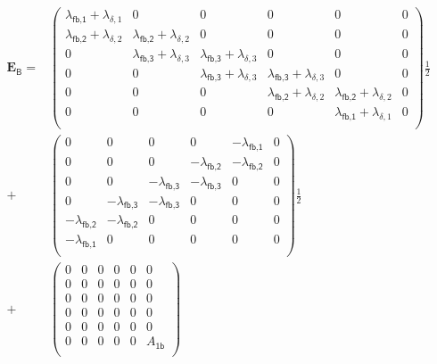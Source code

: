 %
\begin{equation}
\label{equ_04ModellLuft28}
\begin{aligned}
\textbf{E}_\textsf{B} = &\left(\begin{array}{cccccc} 
\lambda_\textsf{fb,1} + \lambda_{\delta,1} & 0 & 0 & 0 & 0 & 0 \\
\lambda_\textsf{fb,2} + \lambda_{\delta,2} & \lambda_\textsf{fb,2} + \lambda_{\delta,2} & 0 & 0 & 0 & 0 \\
0 & \lambda_\textsf{fb,3} + \lambda_{\delta,3} & \lambda_\textsf{fb,3} + \lambda_{\delta,3} & 0 & 0 & 0 \\
0 & 0 & \lambda_\textsf{fb,3} + \lambda_{\delta,3} & \lambda_\textsf{fb,3} + \lambda_{\delta,3} & 0 & 0 \\
0 & 0 & 0 & \lambda_\textsf{fb,2} + \lambda_{\delta,2} & \lambda_\textsf{fb,2} + \lambda_{\delta,2} & 0 \\
0 & 0 & 0 & 0 & \lambda_\textsf{fb,1} + \lambda_{\delta,1} & 0 \\
\end{array}\right) \frac{1}{2} \\
+ &\left(\begin{array}{cccccc} 
0 & 0 & 0 & 0 & -\lambda_\textsf{fb,1} & 0 \\
0 & 0 & 0 & -\lambda_\textsf{fb,2} & -\lambda_\textsf{fb,2} & 0 \\
0 & 0 & -\lambda_\textsf{fb,3} & -\lambda_\textsf{fb,3} & 0 & 0 \\
0 & -\lambda_\textsf{fb,3} & -\lambda_\textsf{fb,3} & 0 & 0 & 0 \\
-\lambda_\textsf{fb,2} & -\lambda_\textsf{fb,2} & 0 & 0 & 0 & 0 \\
-\lambda_\textsf{fb,1} & 0 & 0 & 0 & 0 & 0 \\
\end{array}\right) \frac{1}{2} \\
+ &\left(\begin{array}{cccccc} 
0 & 0 & 0 & 0 & 0 & 0 \\
0 & 0 & 0 & 0 & 0 & 0 \\
0 & 0 & 0 & 0 & 0 & 0 \\
0 & 0 & 0 & 0 & 0 & 0 \\
0 & 0 & 0 & 0 & 0 & 0 \\
0 & 0 & 0 & 0 & 0 & A_\textsf{1b} \\
\end{array}\right)
\end{aligned}
\end{equation}
%

